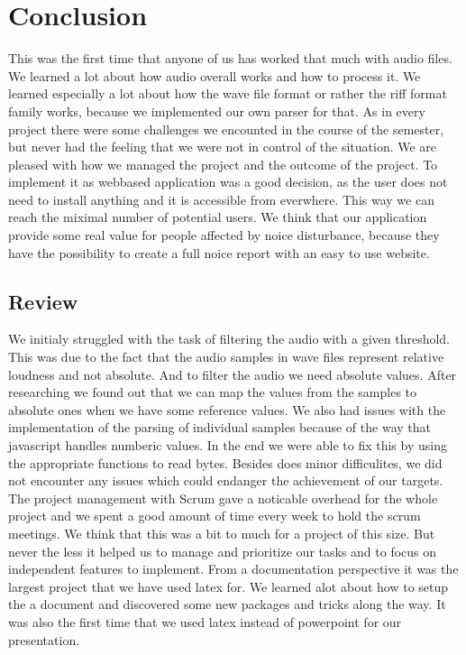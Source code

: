 \section{Conclusion}
This was the first time that anyone of us has worked that much with audio files. We learned a lot about how audio overall works and how to process it. We learned especially a lot about how the wave file format or rather the riff format family works, because we implemented our own parser for that. As in every project there were some challenges we encounted in the course of the semester, but never had the feeling that we were not in control of the situation. We are pleased with how we managed the project and the outcome of the project. To implement it as webbased application was a good decision, as the user does not need to install anything and it is accessible from everwhere. This way we can reach the miximal number of potential users. We think that our application provide some real value for people affected by noice disturbance, because they have the possibility to create a full noice report with an easy to use website.

\subsection{Review}
We initialy struggled with the task of filtering the audio with a given threshold. This was due to the fact that the audio samples in wave files represent relative loudness and not absolute. And to filter the audio we need absolute values. After researching we found out that we can map the values from the samples to absolute ones when we have some reference values. 
We also had issues with the implementation of the parsing of individual samples because of the way that javascript handles numberic values. In the end we were able to fix this by using the appropriate functions to read bytes. Besides does minor difficulites, we did not encounter any issues which could endanger the achievement of our targets. 
The project management with Scrum gave a noticable overhead for the whole project and we spent a good amount of time every week to hold the scrum meetings. We think that this was a bit to much for a project of this size. But never the less it helped us to manage and prioritize our tasks and to focus on independent features to implement. 
From a documentation perspective it was the largest project that we have used latex for. We learned alot about how to setup the a document and discovered some new packages and tricks along the way. It was also the first time that we used latex instead of powerpoint for our presentation.

